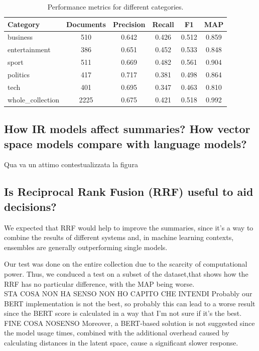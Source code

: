 \begin{center}
    \begin{table}[H]
        \centering
        \begin{tabular}{|l|c|c|c|c|c|}
            \hline
            Category          & Documents & Precision & Recall & F1    & MAP   \\
            \hline
            business          & 510       & 0.642     & 0.426  & 0.512 & 0.859 \\
            entertainment     & 386       & 0.651     & 0.452  & 0.533 & 0.848 \\
            sport             & 511       & 0.669     & 0.482  & 0.561 & 0.904 \\
            politics          & 417       & 0.717     & 0.381  & 0.498 & 0.864 \\
            tech              & 401       & 0.695     & 0.347  & 0.463 & 0.810 \\
            \hline
            whole\_collection & 2225      & 0.675     & 0.421  & 0.518 & 0.992 \\
            \hline
        \end{tabular}
        \caption{Performance metrics for different categories.}
        \label{tab:performance}
    \end{table}
\end{center}

\subsection{How IR models affect summaries? How vector space models compare with language models?}
Qua va un attimo contestualizzata la figura
\subsection{Is Reciprocal Rank Fusion (RRF) useful to aid decisions?}
We expected that RRF would help to improve the summaries, since it's a way to
combine the results of different systems and, in machine learning contexts,
ensembles are generally outperforming single models.

Our test was done on the entire collection due to the scarcity of computational
power. Thus, we conduced a test on a subset of the dataset,that shows how the
RRF has no particular difference, with the MAP being worse. \\ STA COSA NON HA
SENSO NON HO CAPITO CHE INTENDI Probably our BERT implementation is not the
best, so probably this can lead to a worse result since the BERT score is
calculated in a way that I'm not sure if it's the best. \\FINE COSA NOSENSO
Moreover, a BERT-based solution is not suggested since the model usage times,
combined with the additional overhead caused by calculating distances in the
latent space, cause a significant slower response.

